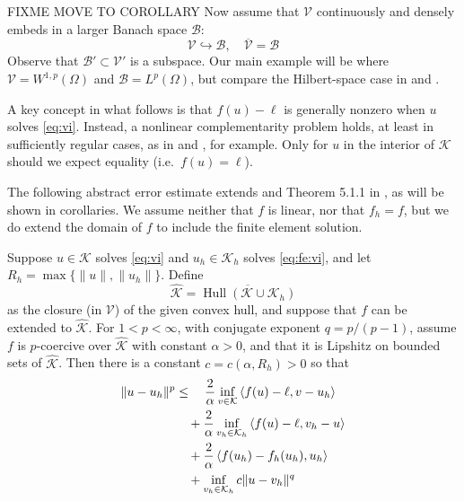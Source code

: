 \documentclass[hidelinks,onefignum,onetabnum,final]{siamart220329}  %
\newcommand{\cB}{\mathcal{B}}
\newcommand{\cK}{\mathcal{K}}
\newcommand{\cV}{\mathcal{V}}
\newcommand{\hcK}{\widehat{\cK}}
\newcommand{\ip}[2]{\left<#1,#2\right>}
\DeclareMathOperator*{\Hull}{Hull}
\begin{document}
FIXME MOVE TO COROLLARY Now assume that $\cV$ continuously and densely embeds in a larger Banach space $\cB$:
\begin{equation}
\cV \hookrightarrow \cB, \quad \overline{\cV} = \cB
\end{equation}
Observe that $\cB' \subset \cV'$ is a subspace.  Our main example will be where $\cV=W^{1,p}(\Omega)$ and $\cB=L^p(\Omega)$, but compare the Hilbert-space case in \cite{Falk1974} and \cite[section 5.1]{Ciarlet2002}.

A key concept in what follows is that $f(u)-\ell$ is generally nonzero when $u$ solves \eqref{eq:vi}.  Instead, a nonlinear complementarity problem holds, at least in sufficiently regular cases, as in \cite[Exercise 5.1.1]{Ciarlet2002}  and \cite[section 7]{BuelerFarrell2024}, for example.  Only for $u$ in the interior of $\cK$ should we expect equality (i.e.~$f(u)=\ell$).

The following abstract error estimate extends \cite{Falk1974} and Theorem 5.1.1 in \cite{Ciarlet2002}, as will be shown in corollaries.  We assume neither that $f$ is linear, nor that $f_h=f$, but we do extend the domain of $f$ to include the finite element solution.

\begin{theorem} \label{thm:abstractestimate}  Suppose $u\in\cK$ solves \eqref{eq:vi} and $u_h\in\cK_h$ solves \eqref{eq:fe:vi}, and let $R_h=\max\{\|u\|,\|u_h\|\}$.  Define
\begin{equation}
\hcK = \overline{\Hull{(\cK \cup \cK_h)}}  \label{eq:convexhull}
\end{equation}
as the closure (in $\cV$) of the given convex hull, and suppose that $f$ can be extended to $\hcK$.  For $1<p<\infty$, with conjugate exponent $q=p/(p-1)$, assume $f$ is $p$-coercive over $\hcK$ with constant $\alpha>0$, and that it is Lipshitz on bounded sets of $\hcK$.  Then there is a constant $c=c(\alpha,R_h)>0$ so that
\begin{align}
\|u-u_h\|^p &\le \quad \frac{2}{\alpha} \inf_{v\in\cK} \ip{f(u)-\ell}{v-u_h} \label{eq:abstractestimate} \\
   &\quad + \frac{2}{\alpha} \inf_{v_h\in\cK_h} \ip{f(u)-\ell}{v_h-u} \notag \\
   &\quad + \frac{2}{\alpha} \ip{f(u_h)-f_h(u_h)}{u_h} \notag \\
   &\quad + \inf_{v_h\in\cK_h} c \|u - v_h\|^q \notag
\end{align}
\end{theorem}
\end{document}
